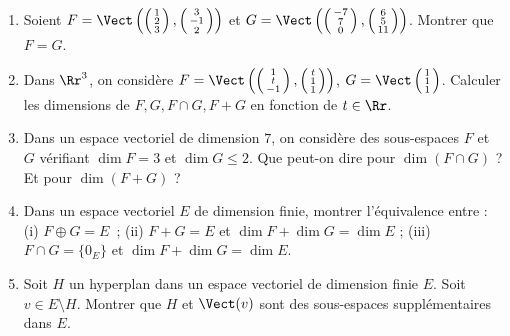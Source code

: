 \documentclass[class=report,crop=false]{standalone}
\begin{document}

\begin{miniexercices}
\sauteligne
\begin{enumerate}
  \item Soient
  $F = \Vect \left( \left(\begin{smallmatrix}1\\2\\3\end{smallmatrix}\right),
  \left(\begin{smallmatrix}3\\-1\\2 \end{smallmatrix}\right)\right)$
  et $G = \Vect \left( \left(\begin{smallmatrix}-7\\7\\0\end{smallmatrix}\right),
  \left(\begin{smallmatrix}6\\5\\11 \end{smallmatrix}\right)\right)$.
  Montrer que $F=G$.

  \item Dans $\Rr^3$, on considère
  $F = \Vect \left( \left(\begin{smallmatrix}1\\t\\-1\end{smallmatrix}\right),
  \left(\begin{smallmatrix}t\\1\\1 \end{smallmatrix}\right)\right)$,
  $G=\Vect \left(\begin{smallmatrix}1\\1\\1 \end{smallmatrix}\right)$. Calculer les dimensions
  de $F,G,F\cap G,F+G$ en fonction de $t\in \Rr$.

  \item Dans un espace vectoriel de dimension $7$, on considère des sous-espaces $F$ et $G$ vérifiant
  $\dim F=3$ et $\dim G \le 2$. Que peut-on dire pour $\dim (F\cap G)$ ? Et pour $\dim (F+G)$ ?

  \item Dans un espace vectoriel $E$ de dimension finie, montrer l'équivalence entre :
  (i) $F\oplus G = E$~;
  (ii) $F+G=E$ et $\dim F + \dim G = \dim E$ ;
  (iii) $F \cap G = \{0_E\}$ et $\dim F + \dim G = \dim E$.

  \item Soit $H$ un hyperplan dans un espace vectoriel de dimension finie $E$. Soit $v\in E\setminus H$.
  Montrer que $H$ et $\Vect(v)$ sont des sous-espaces supplémentaires dans $E$.

\end{enumerate}
\end{miniexercices}
\end{document}
